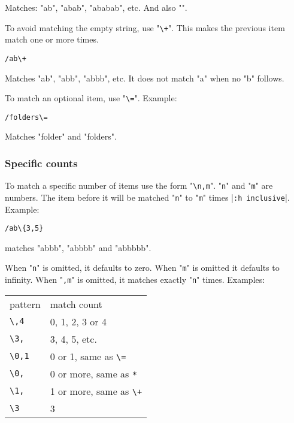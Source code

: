 Matches: "ab", "abab", "ababab", etc.  And also "".

To avoid matching the empty string, use "\texttt{\textbackslash{}+}".
This makes the previous item match one or more times.

\begin{Verbatim}[samepage=true]
 /ab\+
\end{Verbatim}

Matches "ab", "abb", "abbb", etc.
It does not match "a" when no "b" follows.

To match an optional item, use "\texttt{\textbackslash{}=}".
Example:

\begin{Verbatim}[samepage=true]
 /folders\=
\end{Verbatim}

Matches "folder" and "folders".
\subsubsection{Specific counts}
To match a specific number of items use the form "\texttt{\textbackslash{}{n,m}}".
"\texttt{n}" and "\texttt{m}" are numbers.
The item before it will be matched "\texttt{n}" to "\texttt{m}" times |\texttt{:h inclusive}|.
Example:

\begin{Verbatim}[samepage=true]
 /ab\{3,5}
\end{Verbatim}

matches "abbb", "abbbb" and "abbbbb".

When "\texttt{n}" is omitted, it defaults to zero.
When "\texttt{m}" is omitted it defaults to infinity.
When "\texttt{,m}" is omitted, it matches exactly "\texttt{n}" times.
Examples:

\begin{center} \begin{tabular}{l l}
				pattern & match count \\
				\texttt{\textbackslash{}{,4}} & 0, 1, 2, 3 or 4 \\
				\texttt{\textbackslash{}{3,}} & 3, 4, 5, etc. \\
				\texttt{\textbackslash{}{0,1}} & 0 or 1, same as \texttt{\textbackslash{}=} \\
				\texttt{\textbackslash{}{0,}} & 0 or more, same as \texttt{*} \\
				\texttt{\textbackslash{}{1,}} & 1 or more, same as \texttt{\textbackslash{}+} \\
				\texttt{\textbackslash{}{3}} & 3 \\
\end{tabular} \end{center}
